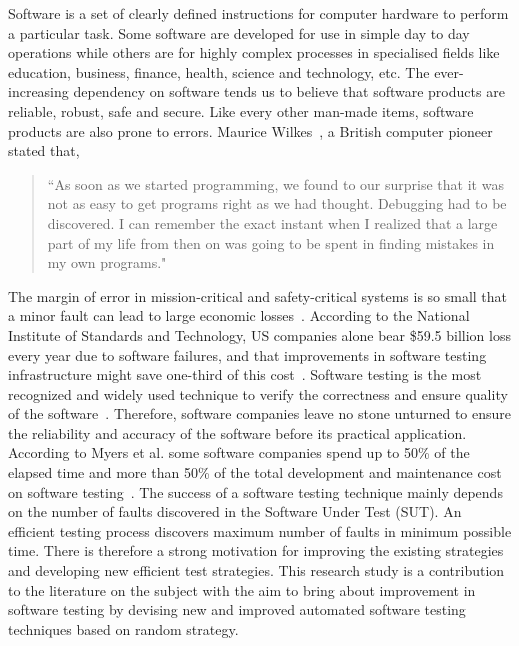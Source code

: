 Software is a set of clearly defined instructions for computer hardware to perform a particular task. Some software are developed for use in simple day to day operations while others are for highly complex processes in specialised fields like education, business, finance, health, science and technology, etc. The ever-increasing dependency on software tends us to believe that software products are reliable, robust, safe and secure. Like every other man-made items, software products are also prone to errors. Maurice Wilkes~\cite{wilkes1985memoirs}, a British computer pioneer stated that,
\smallskip
\begin{quote}
``As soon as we started programming, we found to our surprise that it was not as easy to get programs right as we had thought. Debugging had to be discovered. I can remember the exact instant when I realized that a large part of my life from then on was going to be spent in finding mistakes in my own programs."
\end{quote}
\bigskip
The margin of error in mission-critical and safety-critical systems is so small that a minor fault can lead to large economic losses~\cite{huang2004securing}. According to the National Institute of Standards and Technology, US companies alone bear \$59.5 billion loss every year due to software failures, and that improvements in software testing infrastructure might save one-third of this cost~\cite{tassey2002economic}. Software testing is the most recognized and widely used technique to verify the correctness and ensure quality of the software~\cite{patton2001software}. Therefore, software companies leave no stone unturned to ensure the reliability and accuracy of the software before its practical application. According to Myers et al. some software companies spend up to 50\% of the elapsed time and more than 50\% of the total development and maintenance cost on software testing~\cite{beizer2003software}. The success of a software testing technique mainly depends on the number of faults discovered in the Software Under Test (SUT). An efficient testing process discovers maximum number of faults in minimum possible time. There is therefore a strong motivation for improving the existing strategies and developing new efficient test strategies. This research study is a contribution to the literature on the subject with the aim to bring about improvement in software testing by devising new and improved automated software testing techniques based on random strategy.


